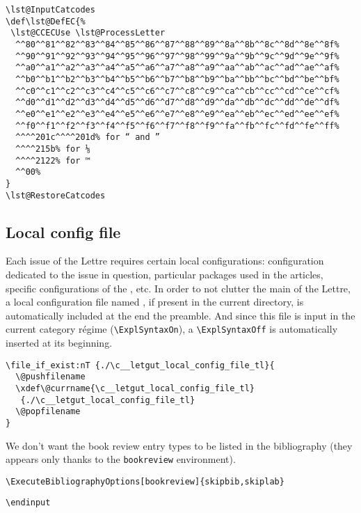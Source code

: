 \documentclass{letgut}
\begin{document}
\begin{lstlisting}
\lst@InputCatcodes
\def\lst@DefEC{%
 \lst@CCECUse \lst@ProcessLetter
  ^^80^^81^^82^^83^^84^^85^^86^^87^^88^^89^^8a^^8b^^8c^^8d^^8e^^8f%
  ^^90^^91^^92^^93^^94^^95^^96^^97^^98^^99^^9a^^9b^^9c^^9d^^9e^^9f%
  ^^a0^^a1^^a2^^a3^^a4^^a5^^a6^^a7^^a8^^a9^^aa^^ab^^ac^^ad^^ae^^af%
  ^^b0^^b1^^b2^^b3^^b4^^b5^^b6^^b7^^b8^^b9^^ba^^bb^^bc^^bd^^be^^bf%
  ^^c0^^c1^^c2^^c3^^c4^^c5^^c6^^c7^^c8^^c9^^ca^^cb^^cc^^cd^^ce^^cf%
  ^^d0^^d1^^d2^^d3^^d4^^d5^^d6^^d7^^d8^^d9^^da^^db^^dc^^dd^^de^^df%
  ^^e0^^e1^^e2^^e3^^e4^^e5^^e6^^e7^^e8^^e9^^ea^^eb^^ec^^ed^^ee^^ef%
  ^^f0^^f1^^f2^^f3^^f4^^f5^^f6^^f7^^f8^^f9^^fa^^fb^^fc^^fd^^fe^^ff%
  ^^^^201c^^^^201d% for “ and ”
  ^^^^215b% for ⅛
  ^^^^2122% for ™
  ^^00%
}
\lst@RestoreCatcodes
\end{lstlisting}

\subsection{Local config file}
\label{ImplementationLocalconfigfile-me7h55h0jlj0}
Each issue of the Lettre requires certain local configurations: configuration
dedicated to the issue in question, particular packages used in the articles,
specific configurations of the , etc. In order to not clutter
the main  of the Lettre, a local configuration file named
, if present in the current directory, is automatically
included at the end the preamble. And since this file is input in the current
category régime (\lstinline+\ExplSyntaxOn+), a \lstinline+\ExplSyntaxOff+ is automatically inserted
at its beginning.

\begin{lstlisting}
\file_if_exist:nT {./\c__letgut_local_config_file_tl}{
  \@pushfilename
  \xdef\@currname{\c__letgut_local_config_file_tl}
   {./\c__letgut_local_config_file_tl}
  \@popfilename
}
\end{lstlisting}

We don't want the book review entry types to be listed in the bibliography
(they appears only thanks to the \lstinline+bookreview+ environment).

\begin{lstlisting}
\ExecuteBibliographyOptions[bookreview]{skipbib,skiplab}
\end{lstlisting}

\begin{lstlisting}
\endinput
\end{lstlisting}
\end{document}
